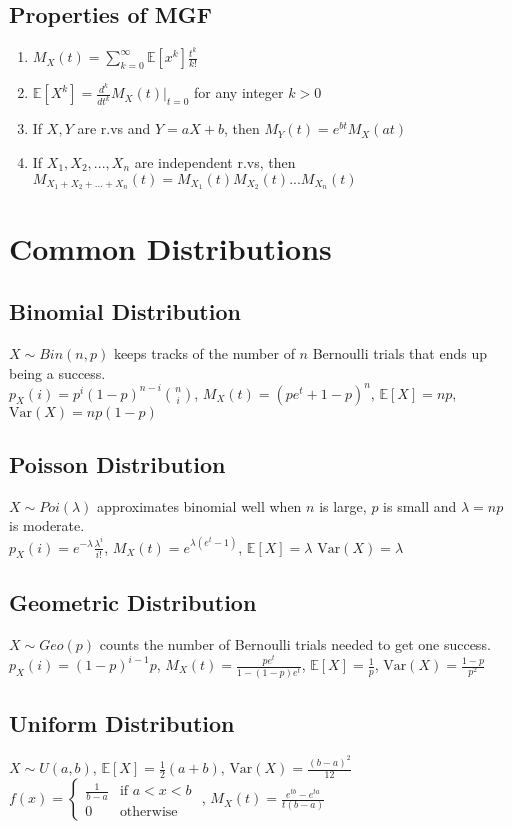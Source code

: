 \documentclass{article}
\newcommand{\E}{\mathbb{E}}
\newcommand{\V}{\mbox{Var}}
\begin{document}
\subsection{Properties of MGF}
\begin{enumerate}
\item $M_X(t) = \sum_{k=0}^{\infty}\E[x^k]\frac{t^k}{k!}$ 
\item $\E[X^k] = \frac{d^k}{dt^k}M_X(t) \big |_{t=0}$ for any integer $k > 0$
\item If $X, Y$ are r.vs and $Y = aX + b$, then $M_Y(t) = e^{bt}M_X(at)$
\item If $X_1, X_2, ..., X_n$ are independent r.vs, then $M_{X_1 + X_2 + ... + X_n}(t) = M_{X_1}(t)M_{X_2}(t) ... M_{X_n}(t)$
\end{enumerate}

\section{Common Distributions}
\subsection{Binomial Distribution}
$X\sim Bin(n, p)$ keeps tracks of the number of $n$ Bernoulli trials that ends up being a success. \\
$p_X(i) = p^i(1-p)^{n-i}\binom{n}{i}$, $M_X(t) = (pe^t + 1 - p)^n$, $\E[X] = np$, $\V(X) = np(1-p)$

\subsection{Poisson Distribution}
$X\sim Poi(\lambda)$ approximates binomial well when $n$ is large, $p$ is small and $\lambda = np$ is moderate. \\
$p_X(i) = e^{-\lambda}\frac{\lambda^i}{i!}$, $M_X(t) = e^{\lambda(e^t - 1)}$, $\E[X] = \lambda$ $\V(X) = \lambda$

\subsection{Geometric Distribution}
$X \sim Geo(p)$ counts the number of Bernoulli trials needed to get one success. \\
$p_X(i) = (1-p)^{i-1}p$, $M_X(t) = \frac{pe^t}{1-(1-p)e^t}$, $\E[X] = \frac{1}{p}$, $\V(X) = \frac{1-p}{p^2}$

\subsection{Uniform Distribution}
$X\sim U(a, b)$, $\E[X] = \frac{1}{2}(a+b)$, $\V(X) = \frac{(b-a)^2}{12}$ \\
$f(x) = \begin{cases} \frac{1}{b-a} & \text{if } a < x < b \\ 
0 & \text{otherwise} \end{cases}$ , $M_X(t) = \frac{e^{tb} - e^{ta}}{t(b-a)}$
\end{document}
